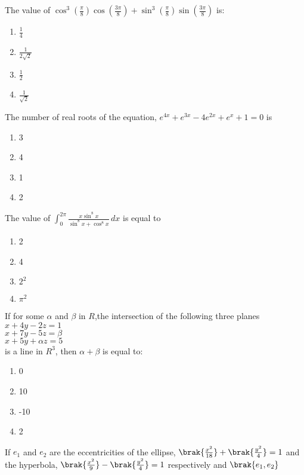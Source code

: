 \item The value of $ \cos^3\left(\frac{\pi}{8}\right) \cos\left(\frac{3\pi}{8}\right) + \sin^3\left(\frac{\pi}{8}\right) \sin\left(\frac{3\pi}{8}\right) $ is: \hfill{}
   \begin{enumerate}
       \item \( \frac{1}{4} \)
      \item \( \frac{1}{2\sqrt{2}} \)
      \item \( \frac{1}{2} \)
      \item \( \frac{1}{\sqrt{2}} \)
   \end{enumerate}
\item The number of real roots of the equation, $e^{4x}+e^{3x}-4e^{2x}+e^{x}+1=0$ is \hfill{}
   \begin{enumerate}
       \item 3
       \item 4
       \item 1
       \item 2
   \end{enumerate}
\item The value of  $\int_0^{2\pi} \frac{x \sin^8 {x}}{\sin^8 {x} + \cos^8 {x}} \, dx
   $ is equal to \hfill{}
   \begin{enumerate}
       \item 2
       \item 4
       \item $2^{2}$
       \item $\pi^{2}$
   \end{enumerate}
\item If for some $\alpha$ and $\beta$ in $R$,the intersection of the following three planes\\$x+4y-2z=1$\\$x+7y-5z=\beta$\\$x+5y+\alpha z=5$\\is a line in $R^{3}$, then $\alpha+\beta$ is equal to$\colon$ \hfill{}
   \begin{enumerate}
       \item 0
       \item 10
       \item -10
       \item 2
   \end{enumerate}
\item If $e_{1}$ and $e_{2}$ are the eccentricities of the ellipse, $\brak{\frac{x^{2}}{18}}+\brak{\frac{y^{2}}{4}}=1$ and the hyperbola, $\brak{\frac{x^{2}}{9}}-\brak{\frac{y^{2}}{4}}=1$ respectively and $\brak{e_{1},e_{2}}$
